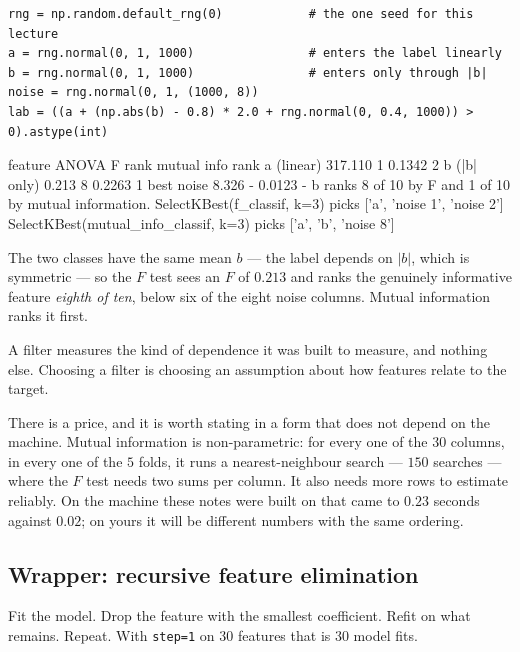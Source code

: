 \documentclass[11pt]{article}
\begin{document}
\begin{lstlisting}
rng = np.random.default_rng(0)            # the one seed for this lecture
a = rng.normal(0, 1, 1000)                # enters the label linearly
b = rng.normal(0, 1, 1000)                # enters only through |b|
noise = rng.normal(0, 1, (1000, 8))
lab = ((a + (np.abs(b) - 0.8) * 2.0 + rng.normal(0, 0.4, 1000)) > 0).astype(int)
\end{lstlisting}
\begin{codeout}
feature             ANOVA F     rank  mutual info     rank
a (linear)          317.110        1       0.1342        2
b (|b| only)          0.213        8       0.2263        1
best noise            8.326        -       0.0123        -
b ranks 8 of 10 by F and 1 of 10 by mutual information.
SelectKBest(f_classif, k=3)           picks ['a', 'noise 1', 'noise 2']
SelectKBest(mutual_info_classif, k=3) picks ['a', 'b', 'noise 8']
\end{codeout}

The two classes have the same mean $b$ --- the label depends on $|b|$, which is
symmetric --- so the $F$ test sees an $F$ of $0.213$ and ranks the genuinely
informative feature \emph{eighth of ten}, below six of the eight noise
columns. Mutual information ranks it first.

\begin{keyidea}
A filter measures the kind of dependence it was built to measure, and nothing
else. Choosing a filter is choosing an assumption about how features relate to
the target.
\end{keyidea}

There is a price, and it is worth stating in a form that does not depend on
the machine. Mutual information is non-parametric: for every one of the $30$
columns, in every one of the $5$ folds, it runs a nearest-neighbour search
--- $150$ searches --- where the $F$ test needs two sums per column. It also
needs more rows to estimate reliably. On the machine these notes were built
on that came to $0.23$ seconds against $0.02$; on yours it will be different
numbers with the same ordering.

\subsection{Wrapper: recursive feature elimination}
\label{sec:rfe}

Fit the model. Drop the feature with the smallest coefficient. Refit on what
remains. Repeat. With \texttt{step=1} on $30$ features that is $30$ model fits.
\end{document}
